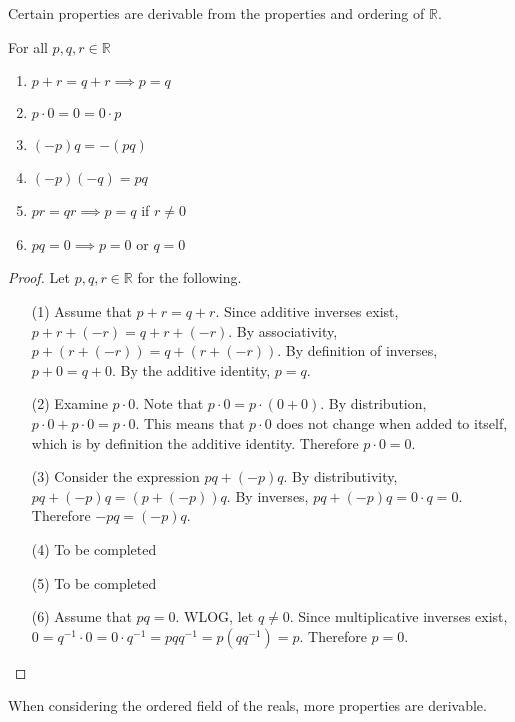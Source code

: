 \documentclass[../notes.tex]{subfiles}
\begin{document}
Certain properties are derivable from the properties and ordering of $\mathbb{R}$.
\begin{theorem}
	\label{thm:propsreals}
	For all $p,q,r \in \mathbb{R}$
	\begin{enumerate}
		\item $p + r = q + r \implies p = q$
		\item $p \cdot 0 = 0 = 0 \cdot p$
		\item $(-p)q = -(pq)$
		\item $(-p)(-q) = pq$
		\item $pr = qr \implies p = q$ if $r \neq 0$
		\item $pq = 0 \implies p=0$ or $q = 0$
	\end{enumerate}
\end{theorem}

\begin{proof}
	Let $p, q, r \in \mathbb{R}$ for the following.
	\begin{enumerate}
		\item[(1)] 
			Assume that $p + r = q + r$. Since additive inverses exist, $p + r + (-r) = q + r + (-r)$. By associativity, $p + (r + (-r)) = q + (r + (-r))$. By definition of inverses, $p + 0 = q + 0$. By the additive identity, $p = q$.
		\item[(2)]
			Examine $p \cdot 0$. Note that $p \cdot 0 = p \cdot (0 + 0)$. By distribution, $p \cdot 0 + p \cdot 0 = p \cdot 0$. This means that $p \cdot 0$ does not change when added to itself, which is by definition the additive identity. Therefore $p \cdot 0 = 0$.
		\item[(3)]
			Consider the expression $pq + (-p)q$. By distributivity, $pq + (-p)q = (p + (-p))q$. By inverses, $pq + (-p)q = 0 \cdot q = 0$. Therefore $-pq = (-p)q$.
		\item[(4)] To be completed
		\item[(5)] To be completed
		\item[(6)] Assume that $pq = 0$. WLOG, let $q \neq 0$. Since multiplicative inverses exist, $0 = q^{-1} \cdot 0 = 0 \cdot q^{-1} = pqq^{-1} = p(qq^{-1}) = p$. Therefore $p = 0$. 
	\end{enumerate}
\end{proof}

When considering the ordered field of the reals, more properties are derivable.
\end{document}
